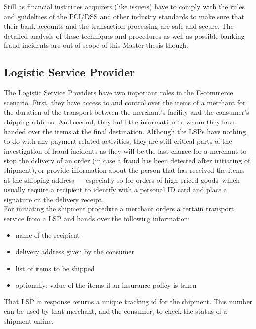 Still as financial institutes acquirers (like issuers) have to comply with the rules and guidelines of the \gls{PCI/DSS} and other industry standards to make sure that their bank accounts and the transaction processing are safe and secure. The detailed analysis of these techniques and procedures as well as possible banking fraud incidents are out of scope of this Master thesis though.


\subsection{Logistic Service Provider}
\label{subsec:stakeholder_lsp}

The Logistic Service Providers have two important roles in the \gls{E-commerce} scenario. First, they have access to and control over the items of a merchant for the duration of the transport between the merchant's facility and the consumer's shipping address. And second, they hold the information to whom they have handed over the items at the final destination. Although the \gls{LSP}s have nothing to do with any payment-related activities, they are still critical parts of the investigation of fraud incidents as they will be the last chance for a merchant to stop the delivery of an order (in case a fraud has been detected after initiating of shipment), or provide information about the person that has received the items at the shipping address --- especially so for orders of high-priced goods, which usually require a recipient to identify with a personal ID card and place a signature on the delivery receipt. \\

For initiating the shipment procedure a merchant orders a certain transport service from a \gls{LSP} and hands over the following information:\@

\begin{itemize}
	\item name of the recipient
	\item delivery address given by the consumer
	\item list of items to be shipped
	\item optionally: value of the items if an insurance policy is taken
\end{itemize}

That \gls{LSP} in response returns a unique tracking id for the shipment. This number can be used by that merchant, and the consumer, to check the status of a shipment online. \\

